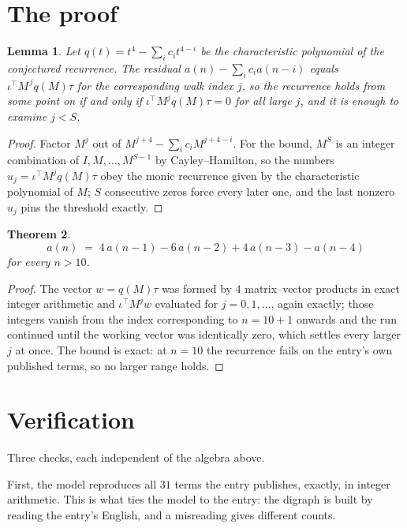 \documentclass[11pt,a4paper]{article}
\theoremstyle{plain}
\newtheorem{theorem}{Theorem}
\newtheorem{lemma}[theorem]{Lemma}
\theoremstyle{definition}
\begin{document}
\section{The proof}

\begin{lemma}\label{lem:crit}
Let $q(t)=t^{4}-\sum_i c_it^{4-i}$ be the characteristic polynomial of the
conjectured recurrence. The residual $a(n)-\sum_ic_ia(n-i)$ equals
$\iota^{\!\top}M^{\,j}q(M)\tau$ for the corresponding walk index $j$, so the recurrence
holds from some point on if and only if $\iota^{\!\top}M^{j}q(M)\tau=0$ for all large $j$,
and it is enough to examine $j<S$.
\end{lemma}

\begin{proof}
Factor $M^{j}$ out of $M^{j+4}-\sum_ic_iM^{j+4-i}$. For the bound, $M^{S}$
is an integer combination of $I,M,\dots,M^{S-1}$ by Cayley--Hamilton, so the numbers
$u_j=\iota^{\!\top}M^{j}q(M)\tau$ obey the monic recurrence given by the characteristic
polynomial of $M$; $S$ consecutive zeros force every later one, and the last nonzero $u_j$
pins the threshold exactly.
\end{proof}

\begin{theorem}
\[
a(n)\;=\;4\,a(n-1) - 6\,a(n-2) + 4\,a(n-3) - a(n-4)
\]
for every $n>10$.
\end{theorem}

\begin{proof}
The vector $w=q(M)\tau$ was formed by $4$ matrix--vector products in exact integer
arithmetic and $\iota^{\!\top}M^{j}w$ evaluated for $j=0,1,\dots$, again exactly; those
integers vanish from the index corresponding to $n=10+1$ onwards and the run continued
until the working vector was identically zero, which settles every larger $j$ at once. The bound is exact: at $n=10$ the recurrence fails on the entry's own published terms, so no larger range holds.
\end{proof}

\section{Verification}

Three checks, each independent of the algebra above.

First, the model reproduces all $31$ terms the entry publishes, exactly, in integer
arithmetic. This is what ties the model to the entry: the digraph is built by reading the
entry's English, and a misreading gives different counts.
\end{document}
